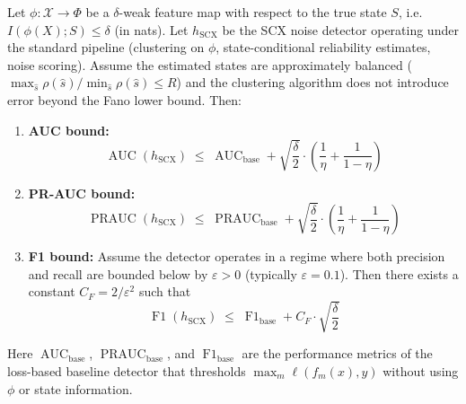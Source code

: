 \begin{theorem}
\label{thm:weak-feature}
Let $\phi: \mathcal{X} \to \Phi$ be a $\delta$-weak feature map with respect to
the true state $S$, i.e.\ $I(\phi(X); S) \leq \delta$ (in nats). Let
$h_{\text{SCX}}$ be the SCX noise detector operating under the standard
pipeline (clustering on $\phi$, state-conditional reliability estimates,
noise scoring). Assume the estimated states are approximately balanced
($\max_{\hat{s}} \rho(\hat{s}) / \min_{\hat{s}} \rho(\hat{s}) \leq R$) and
the clustering algorithm does not introduce error beyond the Fano lower bound.
Then:

\begin{enumerate}
\item[(a)] \textbf{AUC bound:}
\begin{equation}
\boxed{\;
\operatorname{AUC}(h_{\text{SCX}}) \;\leq\;
\operatorname{AUC}_{\text{base}} +
\sqrt{\frac{\delta}{2}}\cdot\left(\frac{1}{\eta} + \frac{1}{1-\eta}\right)
\;}
\label{eq:auc-bound}
\end{equation}

\item[(b)] \textbf{PR-AUC bound:}
\begin{equation}
\boxed{\;
\operatorname{PRAUC}(h_{\text{SCX}}) \;\leq\;
\operatorname{PRAUC}_{\text{base}} +
\sqrt{\frac{\delta}{2}}\cdot\left(\frac{1}{\eta} + \frac{1}{1-\eta}\right)
\;}
\label{eq:prauc-bound}
\end{equation}

\item[(c)] \textbf{F1 bound:}
Assume the detector operates in a regime where both precision and recall
are bounded below by $\varepsilon > 0$ (typically $\varepsilon = 0.1$).
Then there exists a constant $C_F = 2/\varepsilon^2$ such that
\begin{equation}
\boxed{\;
\operatorname{F1}(h_{\text{SCX}}) \;\leq\;
\operatorname{F1}_{\text{base}} + C_F \cdot \sqrt{\frac{\delta}{2}}
\;}
\label{eq:f1-bound}
\end{equation}
\end{enumerate}

Here $\operatorname{AUC}_{\text{base}}$,
$\operatorname{PRAUC}_{\text{base}}$, and $\operatorname{F1}_{\text{base}}$
are the performance metrics of the loss-based baseline detector that thresholds
$\max_m \ell(f_m(x), y)$ without using $\phi$ or state information.
\end{theorem}

